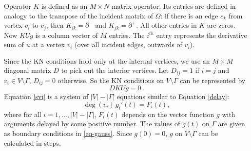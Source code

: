 \documentclass[11pt]{amsart}
\theoremstyle{definition}
\theoremstyle{plain}
\numberwithin{equation}{section}
\begin{document}
Operator $K$ is defined as an $M \times N$ matrix operator. Its entries are defined in analogy to the transpose of the incident matrix of $\Omega$: if there is an edge $e_k$ from vertex $v_i$ to $v_j$, then $K_{ik}=\partial^-$ and $K_{jk}=\partial^+$.   All other entries in $K$ are zeros.  Now $KUg$ is a column vector of $M$ entries.  The $i^{th}$ entry represents the derivative sum of $u$ at a vertex $v_i$ (over all incident edges, outwards of $v_i$).  

Since the KN conditions hold only at the internal vertices,  we use an $M \times M$ diagonal matrix $D$ to pick out the interior vertices.  Let $D_{ij}=1$ if $i=j$ and $v_i \in V \setminus \Gamma$, $D_{ij}=0$ otherwise.  So the KN conditions on $V \setminus \Gamma$ can be represented by 
\begin{equation} \label{svi}
DKUg = 0\,.
\end{equation}
Equation \eqref{svi} is a system of $|V|-|\Gamma|$ equations similar to Equation \eqref{delay}:  
\begin{equation} \label{splitgroup}
\deg(v_i)\, g_i'(t) =F_i(t),
\end{equation}
 where for all $i=1, \dots, |V|-|\Gamma|$, $F_i(t)$ depends on the vector function $g$ with arguments delayed by some positive number. 
 The values of $g(t)$ on $\Gamma$ are given as boundary conditions in \eqref{eq-gauss}. Since $g(0)=0$, $g$ on $V \setminus \Gamma$ can be calculated in steps. 
 
 
 
\end{document}
